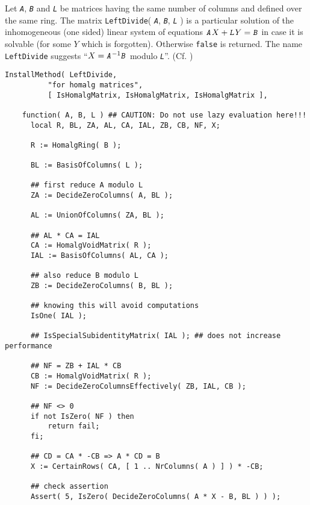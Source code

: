 \documentclass[a4paper,11pt]{report}
\begin{document}
{{{ Let \mbox{\texttt{\mdseries\slshape A}}, \mbox{\texttt{\mdseries\slshape B}} and \mbox{\texttt{\mdseries\slshape L}} be matrices having the same number of columns and defined over the same ring.
The matrix \texttt{LeftDivide}( \mbox{\texttt{\mdseries\slshape A}}, \mbox{\texttt{\mdseries\slshape B}}, \mbox{\texttt{\mdseries\slshape L}} ) is a particular solution of the inhomogeneous (one sided) linear system of
equations $\mbox{\texttt{\mdseries\slshape A}}X+\mbox{\texttt{\mdseries\slshape L}}Y=\mbox{\texttt{\mdseries\slshape B}}$ in case it is solvable (for some $Y$ which is forgotten). Otherwise \texttt{false} is returned. The name \texttt{LeftDivide} suggests ``$X=\mbox{\texttt{\mdseries\slshape A}}^{-1}\mbox{\texttt{\mdseries\slshape B}}$ modulo \mbox{\texttt{\mdseries\slshape L}}''. (Cf. \cite[Subsection 3.1.1]{BR}) 
\begin{Verbatim}[fontsize=\small,frame=single,label=Code]
  InstallMethod( LeftDivide,
          "for homalg matrices",
          [ IsHomalgMatrix, IsHomalgMatrix, IsHomalgMatrix ],
          
    function( A, B, L )	## CAUTION: Do not use lazy evaluation here!!!
      local R, BL, ZA, AL, CA, IAL, ZB, CB, NF, X;
      
      R := HomalgRing( B );
      
      BL := BasisOfColumns( L );
      
      ## first reduce A modulo L
      ZA := DecideZeroColumns( A, BL );
      
      AL := UnionOfColumns( ZA, BL );
      
      ## AL * CA = IAL
      CA := HomalgVoidMatrix( R );
      IAL := BasisOfColumns( AL, CA );
      
      ## also reduce B modulo L
      ZB := DecideZeroColumns( B, BL );
      
      ## knowing this will avoid computations
      IsOne( IAL );
      
      ## IsSpecialSubidentityMatrix( IAL );	## does not increase performance
      
      ## NF = ZB + IAL * CB
      CB := HomalgVoidMatrix( R );
      NF := DecideZeroColumnsEffectively( ZB, IAL, CB );
      
      ## NF <> 0
      if not IsZero( NF ) then
          return fail;
      fi;
      
      ## CD = CA * -CB => A * CD = B
      X := CertainRows( CA, [ 1 .. NrColumns( A ) ] ) * -CB;
      
      ## check assertion
      Assert( 5, IsZero( DecideZeroColumns( A * X - B, BL ) ) );
      

\end{Verbatim}}}}
\end{document}

